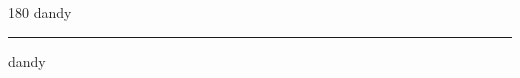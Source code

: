 
\begin{frame}
\begin{center}
\begin{turn}{180}
{\fontsize{2.5cm}{1em}\selectfont dandy}
\end{turn}
\vspace{1em}\par  
\hrule
\vspace{1em}\par  
{\fontsize{2.5cm}{1em}\selectfont dandy}
\end{center}
\end{frame}
